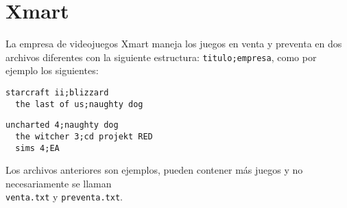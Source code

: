 \section{Xmart}

  La empresa de videojuegos Xmart
  maneja los juegos en venta y preventa
  en dos archivos diferentes con la siguiente estructura:
  \texttt{titulo;empresa},
  como por ejemplo los siguientes:
  
  \begin{lstlisting}[style=consola, caption=\texttt{venta.txt}]
  starcraft ii;blizzard
  the last of us;naughty dog
  \end{lstlisting}
  
  \begin{lstlisting}[style=consola, caption=\texttt{preventa.txt}]
  uncharted 4;naughty dog
  the witcher 3;cd projekt RED
  sims 4;EA
  \end{lstlisting}
  
  Los archivos anteriores son ejemplos,
  pueden contener más juegos y no necesariamente
  se llaman \\
  \texttt{venta.txt} y
  \texttt{preventa.txt}.
  
